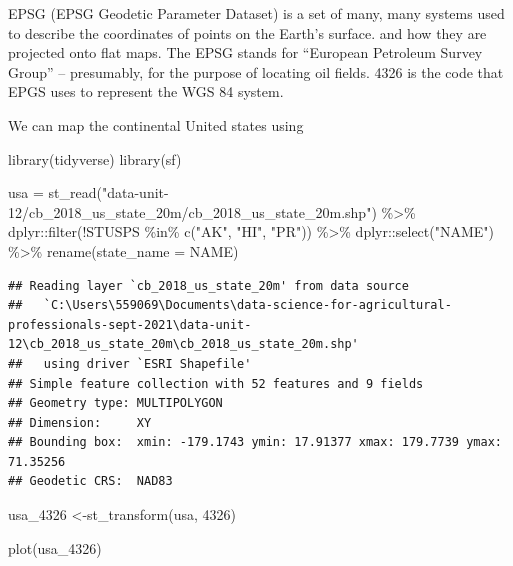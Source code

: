 \documentclass[
]{book}
\newenvironment{Shaded}{\begin{snugshade}}{\end{snugshade}}
\newcommand{\AttributeTok}[1]{\textcolor[rgb]{0.77,0.63,0.00}{#1}}
\newcommand{\DecValTok}[1]{\textcolor[rgb]{0.00,0.00,0.81}{#1}}
\newcommand{\FunctionTok}[1]{\textcolor[rgb]{0.00,0.00,0.00}{#1}}
\newcommand{\NormalTok}[1]{#1}
\newcommand{\OtherTok}[1]{\textcolor[rgb]{0.56,0.35,0.01}{#1}}
\newcommand{\SpecialCharTok}[1]{\textcolor[rgb]{0.00,0.00,0.00}{#1}}
\newcommand{\StringTok}[1]{\textcolor[rgb]{0.31,0.60,0.02}{#1}}
\begin{document}
EPSG (EPSG Geodetic Parameter Dataset) is a set of many, many systems used to describe the coordinates of points on the Earth's surface. and how they are projected onto flat maps. The EPSG stands for ``European Petroleum Survey Group'' -- presumably, for the purpose of locating oil fields. 4326 is the code that EPGS uses to represent the WGS 84 system.

We can map the continental United states using

\begin{Shaded}
\begin{Highlighting}[]
\FunctionTok{library}\NormalTok{(tidyverse)}
\FunctionTok{library}\NormalTok{(sf)}


\NormalTok{usa }\OtherTok{=} \FunctionTok{st\_read}\NormalTok{(}\StringTok{"data{-}unit{-}12/cb\_2018\_us\_state\_20m/cb\_2018\_us\_state\_20m.shp"}\NormalTok{) }\SpecialCharTok{\%\textgreater{}\%}
\NormalTok{  dplyr}\SpecialCharTok{::}\FunctionTok{filter}\NormalTok{(}\SpecialCharTok{!}\NormalTok{STUSPS }\SpecialCharTok{\%in\%} \FunctionTok{c}\NormalTok{(}\StringTok{"AK"}\NormalTok{, }\StringTok{"HI"}\NormalTok{, }\StringTok{"PR"}\NormalTok{)) }\SpecialCharTok{\%\textgreater{}\%}
\NormalTok{  dplyr}\SpecialCharTok{::}\FunctionTok{select}\NormalTok{(}\StringTok{"NAME"}\NormalTok{) }\SpecialCharTok{\%\textgreater{}\%}
  \FunctionTok{rename}\NormalTok{(}\AttributeTok{state\_name =}\NormalTok{ NAME)}
\end{Highlighting}
\end{Shaded}

\begin{verbatim}
## Reading layer `cb_2018_us_state_20m' from data source 
##   `C:\Users\559069\Documents\data-science-for-agricultural-professionals-sept-2021\data-unit-12\cb_2018_us_state_20m\cb_2018_us_state_20m.shp' 
##   using driver `ESRI Shapefile'
## Simple feature collection with 52 features and 9 fields
## Geometry type: MULTIPOLYGON
## Dimension:     XY
## Bounding box:  xmin: -179.1743 ymin: 17.91377 xmax: 179.7739 ymax: 71.35256
## Geodetic CRS:  NAD83
\end{verbatim}

\begin{Shaded}
\begin{Highlighting}[]
\NormalTok{usa\_4326 }\OtherTok{\textless{}{-}}\FunctionTok{st\_transform}\NormalTok{(usa, }\DecValTok{4326}\NormalTok{)}

\FunctionTok{plot}\NormalTok{(usa\_4326)}
\end{Highlighting}
\end{Shaded}
\end{document}
